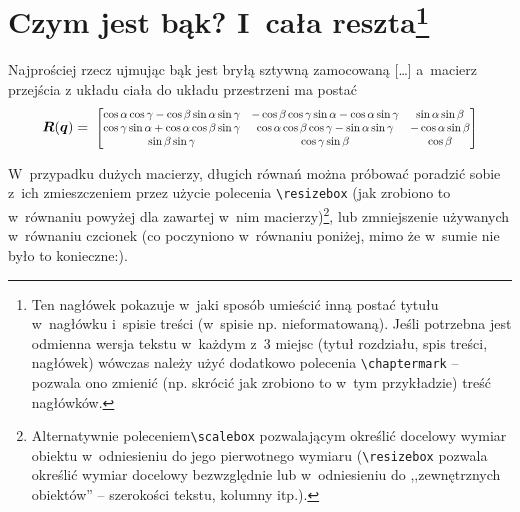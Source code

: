 \chapter[Czym jest bąk? I~cała reszta]{Czym jest bąk? {\red I~cała reszta}\footnote{\red Ten nagłówek pokazuje w~jaki sposób umieścić inną postać tytułu w~nagłówku i~spisie treści (w~spisie np. nieformatowaną). Jeśli potrzebna jest odmienna wersja tekstu w~każdym z~3 miejsc (tytuł rozdziału, spis treści, nagłówek) wówczas należy użyć dodatkowo polecenia \texttt{\textbackslash chaptermark} -- pozwala ono zmienić (np. skrócić jak zrobiono to w~tym przykładzie) treść nagłówków\footnotemark.}}
\label{czym_jest_bak}

Najprościej rzecz ujmując bąk jest bryłą sztywną zamocowaną [\ldots] a~macierz przejścia z układu ciała do układu przestrzeni ma postać
\begin{equation} \label{equ:macierz_rotacji}
    \RR(\qq) = 
    \resizebox{0.8\hsize}{!}{
    $\begin{bmatrix} 
        \cos \alpha  \cos \gamma -\cos \beta  \sin \alpha  \sin \gamma  & -\cos \beta  \cos \gamma  \sin \alpha -\cos \alpha  \sin \gamma  & \sin \alpha  \sin \beta  \\
        \cos \gamma  \sin \alpha +\cos \alpha  \cos \beta  \sin \gamma  & \cos \alpha  \cos \beta  \cos \gamma -\sin \alpha  \sin \gamma  & -\cos \alpha  \sin \beta  \\
         \sin \beta  \sin \gamma  & \cos \gamma  \sin \beta  & \cos \beta  
    \end{bmatrix}$}
\end{equation}

{\red
  W~przypadku dużych macierzy, długich równań można próbować poradzić sobie z~ich zmieszczeniem przez użycie polecenia \texttt{\textbackslash resizebox} (jak zrobiono to w~równaniu powyżej dla zawartej w~nim macierzy)\footnote{\red Alternatywnie poleceniem\texttt{\textbackslash scalebox} pozwalającym określić docelowy wymiar obiektu w~odniesieniu do jego pierwotnego wymiaru (\texttt{\textbackslash resizebox} pozwala określić wymiar docelowy bezwzględnie lub w~odniesieniu do ,,zewnętrznych obiektów'' -- szerokości tekstu, kolumny itp.).}, lub zmniejszenie używanych w~równaniu czcionek (co poczyniono w~równaniu poniżej, mimo że w~sumie nie było to konieczne:).}

